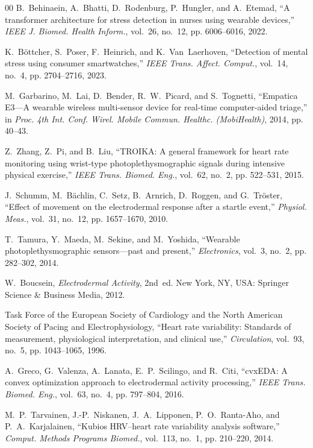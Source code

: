 \documentclass[conference]{IEEEtran}
\begin{document}
\begin{thebibliography}{00}
B.~Behinaein, A.~Bhatti, D.~Rodenburg, P.~Hungler, and A.~Etemad, ``A transformer architecture for stress detection in nurses using wearable devices,'' \textit{IEEE J. Biomed. Health Inform.}, vol.~26, no.~12, pp. 6006--6016, 2022.

K.~B\"ottcher, S.~Poser, F.~Heinrich, and K.~Van~Laerhoven, ``Detection of mental stress using consumer smartwatches,'' \textit{IEEE Trans. Affect. Comput.}, vol.~14, no.~4, pp. 2704--2716, 2023.

M.~Garbarino, M.~Lai, D.~Bender, R.~W.~Picard, and S.~Tognetti, ``Empatica E3---A wearable wireless multi-sensor device for real-time computer-aided triage,'' in \textit{Proc. 4th Int. Conf. Wirel. Mobile Commun. Healthc. (MobiHealth)}, 2014, pp. 40--43.

Z.~Zhang, Z.~Pi, and B.~Liu, ``TROIKA: A general framework for heart rate monitoring using wrist-type photoplethysmographic signals during intensive physical exercise,'' \textit{IEEE Trans. Biomed. Eng.}, vol.~62, no.~2, pp. 522--531, 2015.

J.~Schumm, M.~B\"achlin, C.~Setz, B.~Arnrich, D.~Roggen, and G.~Tr\"oster, ``Effect of movement on the electrodermal response after a startle event,'' \textit{Physiol. Meas.}, vol.~31, no.~12, pp. 1657--1670, 2010.

T.~Tamura, Y.~Maeda, M.~Sekine, and M.~Yoshida, ``Wearable photoplethysmographic sensors---past and present,'' \textit{Electronics}, vol.~3, no.~2, pp. 282--302, 2014.

W.~Boucsein, \textit{Electrodermal Activity}, 2nd~ed. New York, NY, USA: Springer Science \& Business Media, 2012.

Task Force of the European Society of Cardiology and the North American Society of Pacing and Electrophysiology, ``Heart rate variability: Standards of measurement, physiological interpretation, and clinical use,'' \textit{Circulation}, vol.~93, no.~5, pp. 1043--1065, 1996.

A.~Greco, G.~Valenza, A.~Lanata, E.~P.~Scilingo, and R.~Citi, ``cvxEDA: A convex optimization approach to electrodermal activity processing,'' \textit{IEEE Trans. Biomed. Eng.}, vol.~63, no.~4, pp. 797--804, 2016.

M.~P.~Tarvainen, J.-P.~Niskanen, J.~A.~Lipponen, P.~O.~Ranta-Aho, and P.~A.~Karjalainen, ``Kubios HRV--heart rate variability analysis software,'' \textit{Comput. Methods Programs Biomed.}, vol.~113, no.~1, pp. 210--220, 2014.


\end{thebibliography}
\end{document}
